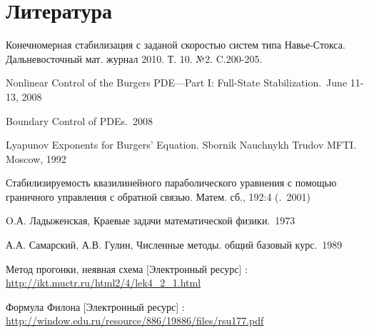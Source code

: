 \section*{Литература}

\vspace{2em}

\begingroup
\renewcommand{\section}[2]{}%

\begin{thebibliography}{}
     Конечномерная стабилизация с заданой 
        скоростью систем типа Навье-Стокса. Дальневосточный мат. журнал 2010. Т.
        10. №2. C.200-205.

     Nonlinear 
        Control of the Burgers PDE—Part I: Full-State Stabilization.\ June 11-13, 2008

     Boundary Control of PDEs.\ 2008

     Lyapunov Exponents for Burgers’ Equation. Sbornik Nauchnykh Trudov MFTI. Moscow, 1992

     Стабилизируемость квазилинейного 
        параболического уравнения с помощью граничного управления с 
        обратной связью. Матем. сб., 192:4 (.\ 2001)

    \bibitem{}
        O.А. Ладыженская, Краевые задачи математической физики.\ 1973

    \bibitem{}
        А.А. Самарский, А.В. Гулин, Численные методы. общий базовый курс.\ 1989

    \bibitem{}
        Метод прогонки, неявная схема [Электронный ресурс] : \url{http://ikt.muctr.ru/html2/4/lek4_2_1.html}

    \bibitem{}
        Формула Филона [Электронный ресурс] : \url{http://window.edu.ru/resource/886/19886/files/rsu177.pdf}

\end{thebibliography}

\endgroup
